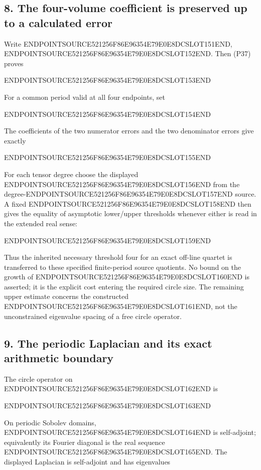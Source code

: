\subsection{8. The four-volume coefficient is preserved up to a calculated error}\label{endpoint-periodized_original--the-four-volume-coefficient-is-preserved-up-to-a-calculated-error}

Write ENDPOINTSOURCE521256F86E96354E79E0E8DCSLOT151END, ENDPOINTSOURCE521256F86E96354E79E0E8DCSLOT152END. Then (P37) proves

ENDPOINTSOURCE521256F86E96354E79E0E8DCSLOT153END

For a common period valid at all four endpoints, set

ENDPOINTSOURCE521256F86E96354E79E0E8DCSLOT154END

The coefficients of the two numerator errors and the two denominator errors give exactly

ENDPOINTSOURCE521256F86E96354E79E0E8DCSLOT155END

For each tensor degree choose the displayed ENDPOINTSOURCE521256F86E96354E79E0E8DCSLOT156END from the degree-ENDPOINTSOURCE521256F86E96354E79E0E8DCSLOT157END source. A fixed ENDPOINTSOURCE521256F86E96354E79E0E8DCSLOT158END then gives the equality of asymptotic lower/upper thresholds whenever either is read in the extended real sense:

ENDPOINTSOURCE521256F86E96354E79E0E8DCSLOT159END

Thus the inherited necessary threshold four for an exact off-line quartet is transferred to these specified finite-period source quotients. No bound on the growth of ENDPOINTSOURCE521256F86E96354E79E0E8DCSLOT160END is asserted; it is the explicit cost entering the required circle size. The remaining upper estimate concerns the constructed ENDPOINTSOURCE521256F86E96354E79E0E8DCSLOT161END, not the unconstrained eigenvalue spacing of a free circle operator.

\subsection{9. The periodic Laplacian and its exact arithmetic boundary}\label{endpoint-periodized_original--the-periodic-laplacian-and-its-exact-arithmetic-boundary}

The circle operator on ENDPOINTSOURCE521256F86E96354E79E0E8DCSLOT162END is

ENDPOINTSOURCE521256F86E96354E79E0E8DCSLOT163END

On periodic Sobolev domains, ENDPOINTSOURCE521256F86E96354E79E0E8DCSLOT164END is self-adjoint; equivalently its Fourier diagonal is the real sequence ENDPOINTSOURCE521256F86E96354E79E0E8DCSLOT165END. The displayed Laplacian is self-adjoint and has eigenvalues

